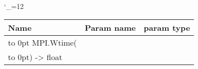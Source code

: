 \begingroup \catcode`\_=12 \tt
\begin{tabular}{lll}
\toprule
\textrm{Name}&\textrm{Param name}&\textrm{param type}\\
\midrule
\hbox to 0pt {MPI.Wtime(\hss}\\
\hbox to 0pt{) -> float\hss}\\
\bottomrule
\end{tabular}
\endgroup

